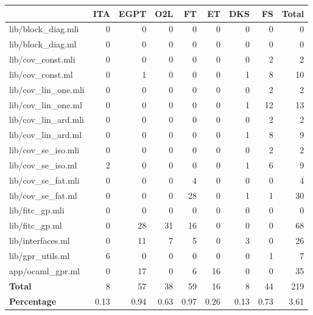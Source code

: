 \begin{tabular}{lrrrrrrrr}
  \hline
  & ITA & EGPT & O2L & FT & ET & DKS & FS & \textbf{Total} \\
  \hline
  lib/block\_diag.mli & 0 & 0 & 0 & 0 & 0 & 0 & 0 & 0 \\
  lib/block\_diag.ml & 0 & 0 & 0 & 0 & 0 & 0 & 0 & 0 \\
  lib/cov\_const.mli & 0 & 0 & 0 & 0 & 0 & 0 & 2 & 2 \\
  lib/cov\_const.ml & 0 & 1 & 0 & 0 & 0 & 1 & 8 & 10 \\
  lib/cov\_lin\_one.mli & 0 & 0 & 0 & 0 & 0 & 0 & 2 & 2 \\
  lib/cov\_lin\_one.ml & 0 & 0 & 0 & 0 & 0 & 1 & 12 & 13 \\
  lib/cov\_lin\_ard.mli & 0 & 0 & 0 & 0 & 0 & 0 & 2 & 2 \\
  lib/cov\_lin\_ard.ml & 0 & 0 & 0 & 0 & 0 & 1 & 8 & 9 \\
  lib/cov\_se\_iso.mli & 0 & 0 & 0 & 0 & 0 & 0 & 2 & 2 \\
  lib/cov\_se\_iso.ml & 2 & 0 & 0 & 0 & 0 & 1 & 6 & 9 \\
  lib/cov\_se\_fat.mli & 0 & 0 & 0 & 4 & 0 & 0 & 0 & 4 \\
  lib/cov\_se\_fat.ml & 0 & 0 & 0 & 28 & 0 & 1 & 1 & 30 \\
  lib/fitc\_gp.mli & 0 & 0 & 0 & 0 & 0 & 0 & 0 & 0 \\
  lib/fitc\_gp.ml & 0 & 28 & 31 & 16 & 0 & 0 & 0 & 68 \\
  lib/interfaces.ml & 0 & 11 & 7 & 5 & 0 & 3 & 0 & 26 \\
  lib/gpr\_utils.ml & 6 & 0 & 0 & 0 & 0 & 0 & 1 & 7 \\
  app/ocaml\_gpr.ml & 0 & 17 & 0 & 6 & 16 & 0 & 0 & 35 \\
  \hline
  \textbf{Total} & 8 & 57 & 38 & 59 & 16 & 8 & 44 & 219 \\
  \textbf{Percentage} & 0.13 & 0.94 & 0.63 & 0.97 & 0.26 & 0.13 & 0.73 & 3.61 \\
  \hline
  \end{tabular}
